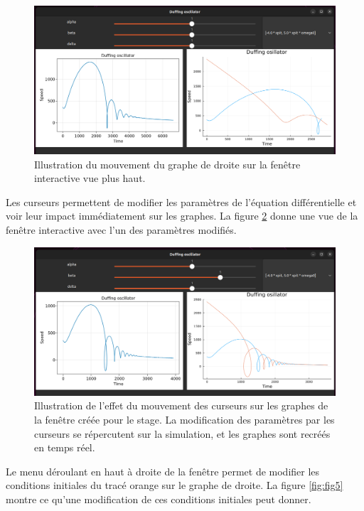 \documentclass[a4paper, french, 12pt, titlepage]{article}
\begin{document}
\begin{figure}[htb]
  \includegraphics[width=\linewidth]{interactivewindow_2.png}
  \caption{Illustration du mouvement du graphe de droite sur la fenêtre interactive vue plus haut.}
  \label{fig:fig3}
\end{figure}


Les curseurs permettent de modifier les paramètres de l'équation différentielle et voir leur impact immédiatement sur les graphes.
La figure \ref{fig:fig4} donne une vue de la fenêtre interactive avec l'un des paramètres modifiés. 


\begin{figure}[H]
  \includegraphics[width=\linewidth]{interactivewindow_3.png}
  \caption{Illustration de l'effet du mouvement des curseurs sur les graphes de la fenêtre créée pour le stage. La modification des paramètres par les curseurs se répercutent sur la simulation, et les graphes sont recréés en temps réel.}
  \label{fig:fig4}
\end{figure}


Le menu déroulant en haut à droite de la fenêtre permet de modifier les conditions initiales du tracé orange sur le graphe de droite.
La figure \ref{fig:fig5} montre ce qu'une modification de ces conditions initiales peut donner. 
\end{document}
